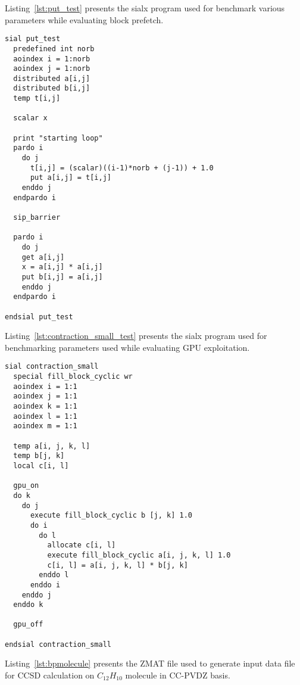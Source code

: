 Listing~\ref{lst:put_test} presents the sialx program used for benchmark various
parameters while evaluating block prefetch.

\begin{lstlisting}[caption={\texttt{put\_test.sialx}: sialx program used for benchmarking prefetching},
  label={lst:put_test}]
sial put_test
  predefined int norb
  aoindex i = 1:norb
  aoindex j = 1:norb
  distributed a[i,j]
  distributed b[i,j]
  temp t[i,j]

  scalar x

  print "starting loop"
  pardo i
    do j
      t[i,j] = (scalar)((i-1)*norb + (j-1)) + 1.0
      put a[i,j] = t[i,j]
    enddo j
  endpardo i

  sip_barrier

  pardo i
    do j
    get a[i,j]
    x = a[i,j] * a[i,j]
    put b[i,j] = a[i,j]
    enddo j
  endpardo i

endsial put_test
\end{lstlisting}

Listing~\ref{lst:contraction_small_test} presents the sialx program used for benchmarking
parameters used while evaluating GPU exploitation.

\begin{lstlisting}[caption={\texttt{contraction\_small\_test.sialx}: sialx program to benchmark GPU exploitation},
  label={lst:contraction_small_test}]
sial contraction_small
  special fill_block_cyclic wr
  aoindex i = 1:1
  aoindex j = 1:1
  aoindex k = 1:1
  aoindex l = 1:1
  aoindex m = 1:1

  temp a[i, j, k, l]
  temp b[j, k]
  local c[i, l]

  gpu_on
  do k
    do j
      execute fill_block_cyclic b [j, k] 1.0
      do i
        do l
          allocate c[i, l]
          execute fill_block_cyclic a[i, j, k, l] 1.0
          c[i, l] = a[i, j, k, l] * b[j, k]
        enddo l
      enddo i
    enddo j
  enddo k

  gpu_off

endsial contraction_small
\end{lstlisting}

Listing~\ref{lst:bpmolecule} presents the ZMAT file used to generate input data
file for CCSD calculation on $C_{12}H_{10}$ molecule in CC-PVDZ basis.

